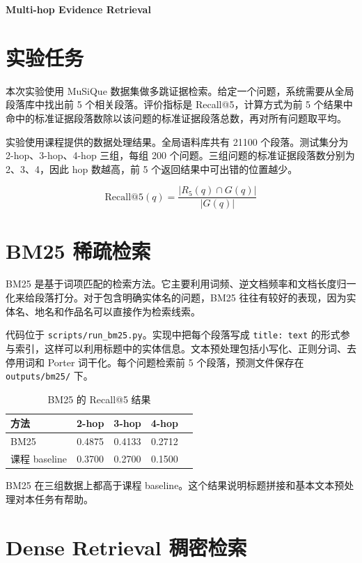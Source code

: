 \documentclass[12pt,letterpaper]{article}
\begin{document}
\begin{center}
    \LARGE
    \bf
    Multi-hop Evidence Retrieval
\end{center}

\section{实验任务}

本次实验使用 MuSiQue 数据集做多跳证据检索。给定一个问题，系统需要从全局段落库中找出前 5 个相关段落。评价指标是 Recall@5，计算方式为前 5 个结果中命中的标准证据段落数除以该问题的标准证据段落总数，再对所有问题取平均。

实验使用课程提供的数据处理结果。全局语料库共有 21100 个段落。测试集分为 2-hop、3-hop、4-hop 三组，每组 200 个问题。三组问题的标准证据段落数分别为 2、3、4，因此 hop 数越高，前 5 个返回结果中可出错的位置越少。

\[
\mathrm{Recall@5}(q)=\frac{|R_5(q)\cap G(q)|}{|G(q)|}
\]

\section{BM25 稀疏检索}

BM25 是基于词项匹配的检索方法。它主要利用词频、逆文档频率和文档长度归一化来给段落打分。对于包含明确实体名的问题，BM25 往往有较好的表现，因为实体名、地名和作品名可以直接作为检索线索。

代码位于 \texttt{scripts/run\_bm25.py}。实现中把每个段落写成 \texttt{title: text} 的形式参与索引，这样可以利用标题中的实体信息。文本预处理包括小写化、正则分词、去停用词和 Porter 词干化。每个问题检索前 5 个段落，预测文件保存在 \texttt{outputs/bm25/} 下。

\begin{table}[H]
\centering
\begin{tabular}{lcccc}
\toprule
方法 & 2-hop & 3-hop & 4-hop  \\
\midrule
BM25 & 0.4875 & 0.4133 & 0.2712 \\
课程 baseline & 0.3700 & 0.2700 & 0.1500 \\
\bottomrule
\end{tabular}
\caption{BM25 的 Recall@5 结果}
\end{table}

BM25 在三组数据上都高于课程 baseline。这个结果说明标题拼接和基本文本预处理对本任务有帮助。

\section{Dense Retrieval 稠密检索}
\end{document}
